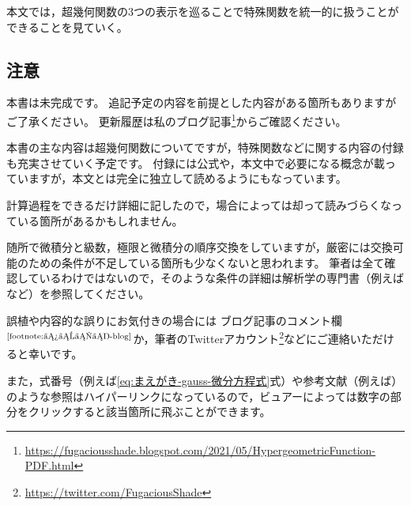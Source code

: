 \documentclass[a4paper,draft]{ltjsarticle}
\begin{document}
本文では，超幾何関数の3つの表示を巡ることで特殊関数を統一的に扱うことができることを見ていく。

\subsection*{注意}
本書は未完成です。
追記予定の内容を前提とした内容がある箇所もありますがご了承ください。
更新履歴は私のブログ記事\footnote{\label{footnote:まえがき-blog}\url{https://fugaciousshade.blogspot.com/2021/05/HypergeometricFunction-PDF.html}}からご確認ください。

本書の主な内容は超幾何関数についてですが，特殊関数などに関する内容の付録も充実させていく予定です。
付録には公式や，本文中で必要になる概念が載っていますが，本文とは完全に独立して読めるようにもなっています。

計算過程をできるだけ詳細に記したので，場合によっては却って読みづらくなっている箇所があるかもしれません。

随所で微積分と級数，極限と微積分の順序交換をしていますが，厳密には交換可能のための条件が不足している箇所も少なくないと思われます。
筆者は全て確認しているわけではないので，そのような条件の詳細は解析学の専門書（例えば\cite[杉浦]{sugiura}など）を参照してください。


誤植や内容的な誤りにお気付きの場合には
ブログ記事のコメント欄${}^\text{\ref{footnote:まえがき-blog}}$か，筆者のTwitterアカウント\footnote{\url{https://twitter.com/FugaciousShade}}などにご連絡いただけると幸いです。

また，式番号（例えば\eqref{eq:まえがき-gauss-微分方程式}式）や参考文献（例えば\cite[原岡]{haraoka}）のような参照はハイパーリンクになっているので，ビュアーによっては数字の部分をクリックすると該当箇所に飛ぶことができます。
\end{document}
